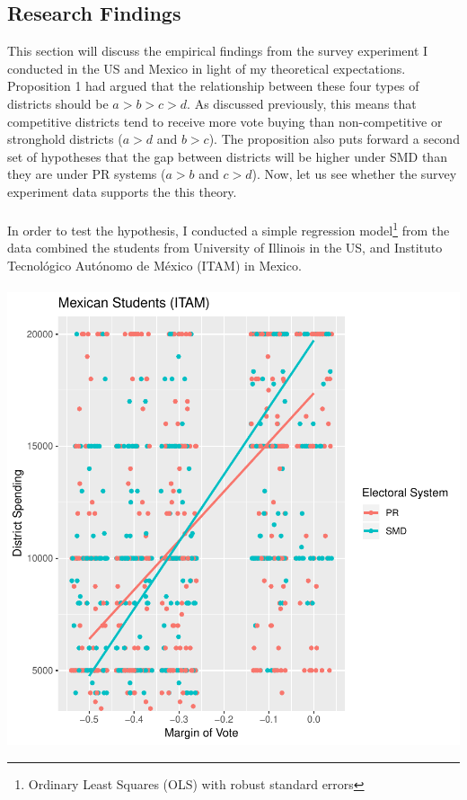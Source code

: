 \documentclass{article}
\begin{document}
\subsection{Research Findings}
This section will discuss the empirical findings from the survey experiment I conducted in the US and Mexico in light of my theoretical expectations. Proposition 1 had argued that the relationship between these four types of districts should be $a>b>c>d$. As discussed previously, this means that competitive districts tend to receive more vote buying than non-competitive or stronghold districts ($a>d$ and $b>c$). The proposition also puts forward a second set of hypotheses that the gap between districts will be higher under SMD than they are under PR systems ($a>b$ and $c>d$). Now, let us see whether the survey experiment data supports the this theory.\\
\\
In order to test the hypothesis, I conducted a simple regression model\footnote{Ordinary Least Squares (OLS) with robust standard errors} from the data combined the students from University of Illinois in the US, and Instituto Tecnol\'{o}gico Aut\'{o}nomo de M\'{e}xico (ITAM) in Mexico.\\
\\


\includegraphics{Dilgin_MPSA-002}
\end{document}
